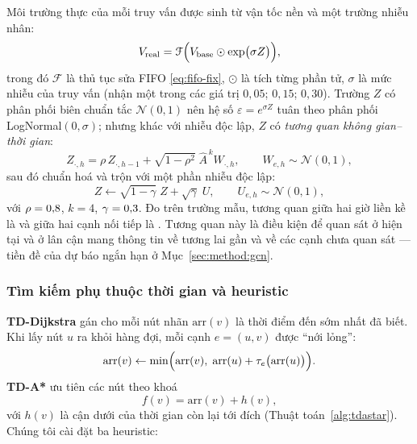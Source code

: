 Môi trường thực của mỗi truy vấn được sinh từ vận tốc nền và một trường nhiễu nhân:
\begin{equation}
V_{\text{real}} = \mathcal{F}\Bigl(V_{\text{base}}\odot \exp\bigl(\sigma Z\bigr)\Bigr),
\label{eq:vreal}
\end{equation}
trong đó $\mathcal{F}$ là thủ tục sửa FIFO \eqref{eq:fifo-fix}, $\odot$ là tích từng phần tử, $\sigma$ là mức nhiễu của
truy vấn (nhận một trong các giá trị $0{,}05$; $0{,}15$; $0{,}30$). Trường $Z$ có phân phối biên chuẩn tắc $\mathcal{N}(0,1)$ nên hệ số $\varepsilon=e^{\sigma Z}$
tuân theo phân phối LogNormal$(0,\sigma)$; nhưng khác với nhiễu độc lập, $Z$ có \emph{tương quan không gian--thời gian}:
\begin{equation}
Z_{\cdot,h} = \rho\, Z_{\cdot,h-1} + \sqrt{1-\rho^2}\; \hat{A}^{\,k} W_{\cdot,h}, \qquad W_{e,h}\sim\mathcal{N}(0,1),
\label{eq:ar1}
\end{equation}
sau đó chuẩn hoá và trộn với một phần nhiễu độc lập:
\begin{equation}
Z \leftarrow \sqrt{1-\gamma}\; Z + \sqrt{\gamma}\; U, \qquad U_{e,h}\sim\mathcal{N}(0,1),
\label{eq:mix}
\end{equation}
với $\rho=0{,}8$, $k=4$, $\gamma=0{,}3$. Đo trên trường mẫu, tương quan giữa hai giờ liền kề là \NoiseLagCorr{}
và giữa hai cạnh nối tiếp là \NoiseAdjCorr. Tương quan này là điều kiện để quan sát ở hiện tại và ở lân cận mang thông
tin về tương lai gần và về các cạnh chưa quan sát --- tiền đề của dự báo ngắn hạn ở Mục~\ref{sec:method:gcn}.

\subsubsection{Tìm kiếm phụ thuộc thời gian và heuristic}\label{sec:method:search}

\textbf{TD-Dijkstra} gán cho mỗi nút nhãn $\text{arr}(v)$ là thời điểm đến sớm nhất đã biết. Khi lấy nút $u$ ra khỏi hàng
đợi, mỗi cạnh $e=(u,v)$ được ``nới lỏng'':
\begin{equation}
\text{arr}(v) \leftarrow \min\Bigl(\text{arr}(v),\; \text{arr}(u) + \tau_e\bigl(\text{arr}(u)\bigr)\Bigr).
\label{eq:relax}
\end{equation}
\textbf{TD-A*} ưu tiên các nút theo khoá
\begin{equation}
f(v) = \text{arr}(v) + h(v),
\label{eq:astar-key}
\end{equation}
với $h(v)$ là cận dưới của thời gian còn lại tới đích (Thuật toán~\ref{alg:tdastar}). Chúng tôi cài đặt ba heuristic:

